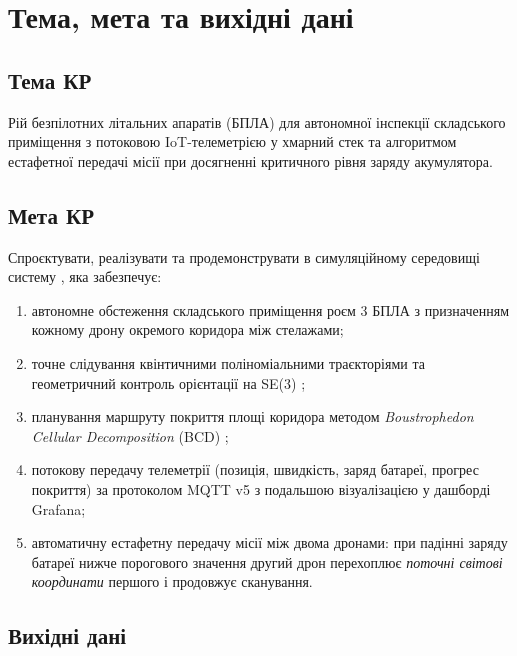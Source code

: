 \section{Тема, мета та вихідні дані}

\subsection*{Тема КР}

Рій безпілотних літальних апаратів (БПЛА) для автономної інспекції складського приміщення з потоковою IoT-телеметрією у хмарний стек та алгоритмом естафетної передачі місії при досягненні критичного рівня заряду акумулятора.

\subsection*{Мета КР}

Спроєктувати, реалізувати та продемонструвати в симуляційному середовищі систему \projname{}, яка забезпечує:

\begin{enumerate}[itemsep=2pt]
  \item автономне обстеження складського приміщення роєм 3 БПЛА з призначенням кожному дрону окремого коридора між стелажами;
  \item точне слідування квінтичними поліноміальними траєкторіями \cite{Lynch2017} та геометричний контроль орієнтації на SE(3) \cite{Lee2010,Mellinger2011};
  \item планування маршруту покриття площі коридора методом \emph{Boustrophedon Cellular Decomposition} (BCD) \cite{Choset2000};
  \item потокову передачу телеметрії (позиція, швидкість, заряд батареї, прогрес покриття) за протоколом MQTT v5 \cite{MQTT5} з подальшою візуалізацією у дашборді Grafana;
  \item автоматичну естафетну передачу місії між двома дронами: при падінні заряду батареї нижче порогового значення другий дрон перехоплює \emph{поточні світові координати} першого і продовжує сканування.
\end{enumerate}

\subsection*{Вихідні дані}


